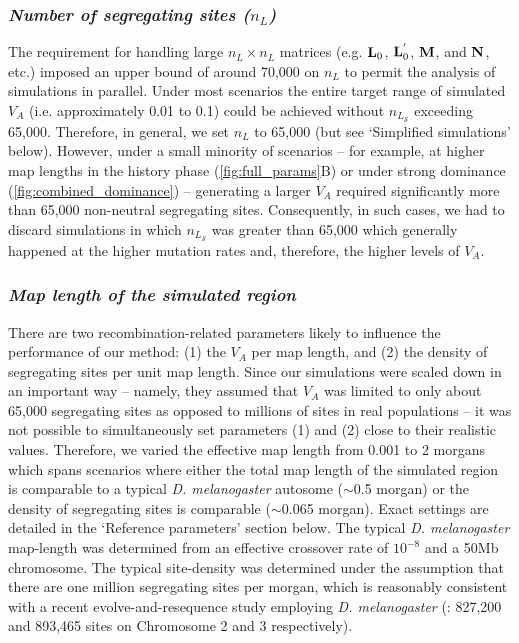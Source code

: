 \documentclass[12pt]{article}
\begin{document}
\begin{bibunit}
\subsubsection*{\textit{Number of segregating sites ($n_L$)}}

The requirement for handling large $n_L \times n_L$ matrices (e.g. ${\bf L}_0$, ${\bf L}^{'}_0$, $\bf M$, and $\bf N$, etc.) imposed an upper bound of around 70,000 on $n_L$ to permit the analysis of simulations in parallel. Under most scenarios the entire target range of simulated $V_A$ (i.e. approximately 0.01 to 0.1) could be achieved without $n_{L_\mathcal{S}}$ exceeding 65,000. Therefore, in general, we set $n_L$ to 65,000 (but see `Simplified simulations' below). However, under a small minority of scenarios -- for example, at higher map lengths in the history phase (\ref{fig:full_params}B) or under strong dominance (\ref{fig:combined_dominance}) -- generating a larger $V_A$ required significantly more than 65,000 non-neutral segregating sites. Consequently, in such cases, we had to discard simulations in which $n_{L_\mathcal{S}}$ was greater than 65,000 which generally happened at the higher mutation rates and, therefore, the higher levels of $V_A$. 

\subsubsection*{\textit{Map length of the simulated region}}

There are two recombination-related parameters likely to influence the performance of our method: (1) the $V_A$ per map length, and (2) the density of segregating sites per unit map length. Since our simulations were scaled down in an important way -- namely, they assumed that $V_A$ was limited to only about 65,000 segregating sites as opposed to millions of sites in real populations -- it was not possible to simultaneously set parameters (1) and (2) close to their realistic values. Therefore, we varied the effective map length from 0.001 to 2 morgans which spans scenarios where either the total map length of the simulated region is comparable to a typical \emph{D. melanogaster} autosome ($\sim$0.5 morgan) or the density of segregating sites is comparable ($\sim$0.065 morgan). Exact settings are detailed in the `Reference parameters' section below. The typical \emph{D. melanogaster} map-length was determined from an effective crossover rate of $10^{-8}$ \citep{comeron2012many,wang2023variation} and a 50Mb chromosome. The typical site-density was determined under the assumption that there are one million segregating sites per morgan, which is reasonably consistent with a recent evolve-and-resequence study employing \emph{D. melanogaster} (\citet{Bitter.2024}: 827,200 and 893,465 sites on Chromosome 2 and 3 respectively). 


\end{bibunit}
\end{document}
